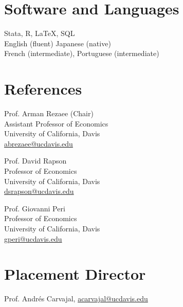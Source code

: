 \documentclass[10pt]{res} %
\begin{document}
\begin{resume}


\section{Software and Languages}
Stata, R, \LaTeX, SQL \\
English (fluent) Japanese (native) \\
French (intermediate), Portuguese (intermediate)
 


\section{References}
\begin{multicols}{2}
	
	Prof. Arman Rezaee  (Chair)\\
	Assistant Professor of Economics \\
	University of California, Davis \\
	\href{mailto:}{abrezaee@ucdavis.edu}
	
	
	\vfill\columnbreak
	
	Prof. David Rapson  \\
	Professor of Economics \\
	University of California, Davis \\
	\href{mailto:}{dsrapson@ucdavis.edu}
	
\end{multicols}

Prof. Giovanni Peri  \\
Professor of Economics \\
University of California, Davis \\
\href{mailto:}{gperi@ucdavis.edu }

\section{Placement Director} 
Prof. Andr\'{e}s Carvajal, 	\href{mailto:}{acarvajal@ucdavis.edu}


\end{resume} 
\end{document}
